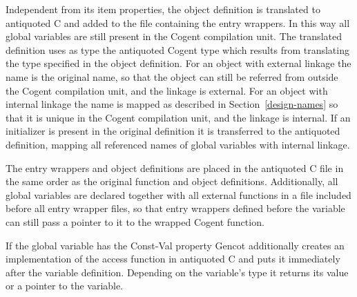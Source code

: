 Independent from its item properties, the object definition is translated to antiquoted C and added to the file 
containing the entry wrappers. In this way all global variables are still present in the Cogent compilation unit.
The translated definition uses as type the antiquoted Cogent type which results from translating the type specified 
in the object definition. For an object with external linkage the name is the original name, so that the object can still
be referred from outside the Cogent compilation unit, and the linkage is external. For an object with internal linkage
the name is mapped as described in Section~\ref{design-names} so that it is unique in the Cogent compilation unit, and
the linkage is internal. If an initializer is present in the original definition it is transferred to the antiquoted
definition, mapping all referenced names of global variables with internal linkage.

The entry wrappers and object definitions are placed in the antiquoted C file in the same order as the original function
and object definitions. Additionally, all global variables are declared together with all external functions in a 
file included before all entry wrapper files, so that entry
wrappers defined before the variable can still pass a pointer to it to the wrapped Cogent function.

If the global variable has the Const-Val property Gencot additionally creates an implementation of the access function
in antiquoted C and puts it immediately after the variable definition. Depending on the variable's type it returns its
value or a pointer to the variable. 
